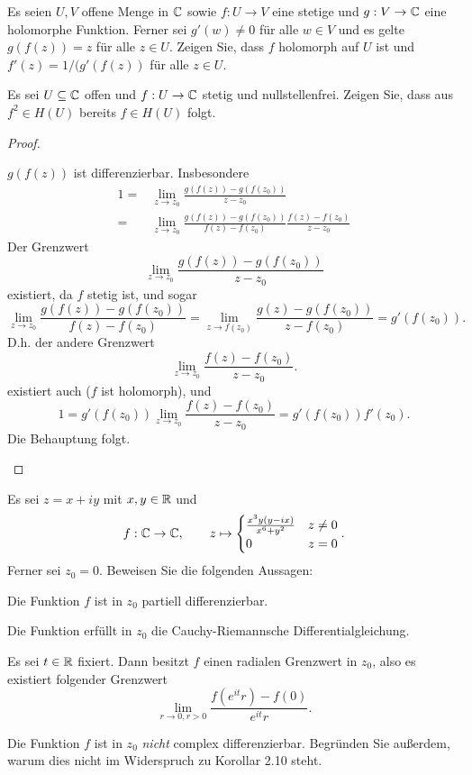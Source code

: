 \begin{Problem}
	\begin{parts}
	\item Es seien $U,V$ offene Menge in $\mathbb{C}$ sowie $f:U\to V$ eine stetige und $g:V\to \mathbb{C}$ eine holomorphe Funktion. Ferner sei $g'(w)\neq 0$ f\"{u}r alle $w\in V$ und es gelte $g(f(z))=z$ f\"{u}r alle $z\in U$. Zeigen Sie, dass $f$ holomorph auf $U$ ist und $f'(z)=1 / (g'(f(z))$ f\"{u}r alle $z\in U$.
	\item Es sei $U\subseteq \mathbb{C}$ offen und $f:U\to \mathbb{C}$ stetig und nullstellenfrei. Zeigen Sie, dass aus $f^2\in H(U)$ bereits $f\in H(U)$ folgt.
	\end{parts}
\end{Problem}
\begin{proof}
	\begin{parts}
	\item $g(f(z))$ ist differenzierbar. Insbesondere
		\begin{align*}
			1=&\lim_{z \to z_0} \frac{g(f(z))-g(f(z_0))}{z-z_0}\\
			=&\lim_{z \to z_0} \frac{g(f(z))-g(f(z_0))}{f(z)-f(z_0)}\frac{f(z)-f(z_0)}{z-z_0}
		\end{align*}
		Der Grenzwert
		\[
		\lim_{z \to z_0} \frac{g(f(z))-g(f(z_0))}{z-z_0}
	\]
	existiert, da $f$ stetig ist, und sogar
	\[
		\lim_{z \to z_0} \frac{g(f(z))-g(f(z_0))}{f(z)-f(z_0)}=\lim_{z \to f(z_0)} \frac{g(z)-g(f(z_0))}{z-f(z_0)}=g'(f(z_0))
	.\] 
	D.h. der andere Grenzwert 
\[
\lim_{z \to z_0} \frac{f(z)-f(z_0)}{z-z_0}
.\] 
	existiert auch ($f$ ist holomorph), und
	\[
	1=g'(f(z_0)) \lim_{z \to z_0} \frac{f(z)-f(z_0)}{z-z_0}=g'(f(z_0)) f'(z_0)
	.\]
	Die Behauptung folgt.
\item 
	\end{parts}
\end{proof}
\begin{Problem}
	Es sei $z=x+iy$ mit $x,y\in \mathbb{R}$ und
	\[
	f:\mathbb{C}\to \mathbb{C},\qquad z\mapsto \begin{cases}
		\frac{x^3y(y-ix)}{x^6+y^2} & z\neq 0\\
		0 & z = 0
	\end{cases}
	.\] 
	Ferner sei $z_0=0$. Beweisen Sie die folgenden Aussagen:
	\begin{parts}
	\item Die Funktion $f$ ist in $z_0$ partiell differenzierbar.
	\item Die Funktion erf\"{u}llt in $z_0$ die Cauchy-Riemannsche Differentialgleichung.
	\item Es sei $t\in \mathbb{R}$ fixiert. Dann besitzt $f$ einen radialen Grenzwert in $z_0$, also es existiert folgender Grenzwert
		\[
			\lim_{r \to 0,r>0} \frac{f(e^{it}r)-f(0)}{e^{it}r}
		.\] 
	\item Die Funktion $f$ ist in $z_0$ \emph{nicht} complex differenzierbar. Begr\"{u}nden Sie außerdem, warum dies nicht im Widerspruch zu Korollar 2.10 steht.
	\end{parts}
\end{Problem}
